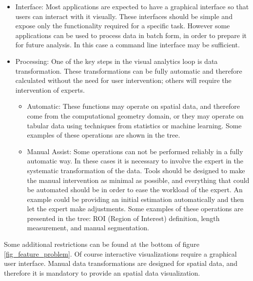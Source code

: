 \begin{itemize}
\begin{itemize}
\end{itemize}
\item Interface: Most applications are expected to have a graphical interface so that users can interact with it visually. These interfaces should be simple and expose only the functionality required for a specific task. However some applications can be used to process data in batch form, in order to prepare it for future analysis. In this case a command line interface may be sufficient. 
\item Processing: One of the key steps in the visual analytics loop is data transformation. These transformations can be fully automatic and therefore calculated without the need for user intervention; others will require the intervention of experts.
\begin{itemize}
\item Automatic: These functions may operate on spatial data, and therefore come from the computational geometry domain, or they may operate on tabular data using techniques from statistics or machine learning. Some examples of these operations are shown in the tree.
\item  Manual Assist: Some operations can not be performed reliably in a fully automatic way. In these cases it is necessary to involve the expert in the systematic transformation of the data. Tools should be designed to make the manual intervention as minimal as possible, and everything that could be automated should be in order to ease the workload of the expert. An example could be providing an initial estimation automatically and then let the expert make adjustments. Some examples of these operations are presented in the tree: ROI (Region of Interest) definition, length measurement, and manual segmentation.

\end{itemize}

\end{itemize}

Some additional restrictions can be found at the bottom of figure \ref{fig_feature_problem}. Of course interactive visualizations require a graphical user interface. Manual data transformations are designed for spatial data, and therefore it is mandatory to provide an spatial data visualization.

